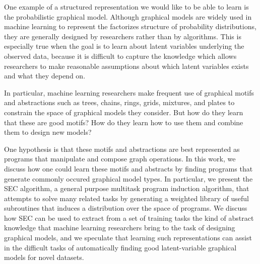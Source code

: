 \documentclass{article} %
\begin{document}
One example of a structured representation we would like to be able to learn is the probabilistic graphical model. Although graphical models are widely used in machine learning to represent the factorizes structure of probability distributions, they are generally designed by researchers rather than by algorithms. This is especially true when the goal is to learn about latent variables underlying the observed data, because it is difficult to capture the knowledge which allows researchers to make reasonable assumptions about which latent variables exists and what they depend on. 

In particular, machine learning researchers make frequent use of graphical motifs and abstractions such as trees, chains, rings, grids, mixtures, and plates to constrain the space of graphical models they consider. But how do they learn that these are good motifs? How do they learn how to use them and combine them to design new models? 

One hypothesis is that these motifs and abstractions are best represented as programs that manipulate and compose graph operations. In this work, we discuss how one could learn these motifs and abstracts by finding programs that generate commonly occured graphical model types. In particular, we present the SEC algorithm, a general purpose multitask program induction algorithm, that attempts to solve many related tasks by generating a weighted library of useful subroutines that induces a distribution over the space of programs. We discuss how SEC can be used to extract from a set of training tasks the kind of abstract knowledge that machine learning researchers bring to the task of designing graphical models, and we speculate that learning such representations can assist in the difficult tasks of automatically finding good latent-variable graphical models for novel datasets. 

\end{document}
